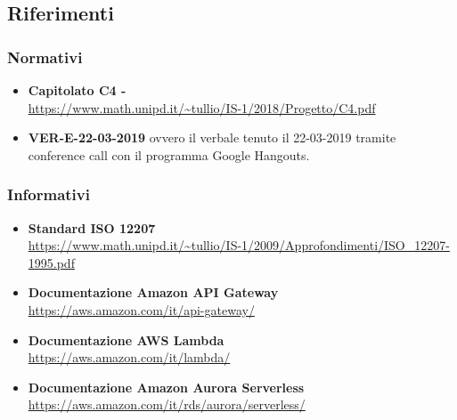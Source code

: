 \subsection{Riferimenti}
\subsubsection{Normativi}
\begin{itemize}
    \item \textbf{Capitolato C4 - \projectName{}}\\ \url{https://www.math.unipd.it/~tullio/IS-1/2018/Progetto/C4.pdf}
    \item \textbf{VER-E-22-03-2019} ovvero il verbale tenuto il 22-03-2019 tramite conference call con il programma Google Hangouts. 
\end{itemize}
\subsubsection{Informativi}
\begin{itemize}
    \item \textbf{Standard ISO 12207}\\ \url{ https://www.math.unipd.it/~tullio/IS-1/2009/Approfondimenti/ISO\_12207-1995.pdf}
    \item \textbf{Documentazione Amazon API Gateway} \\\url{https://aws.amazon.com/it/api-gateway/}
    \item \textbf{Documentazione AWS Lambda} \\\url{https://aws.amazon.com/it/lambda/}
    \item \textbf{Documentazione Amazon Aurora Serverless} \\\url{https://aws.amazon.com/it/rds/aurora/serverless/}   
\end{itemize}